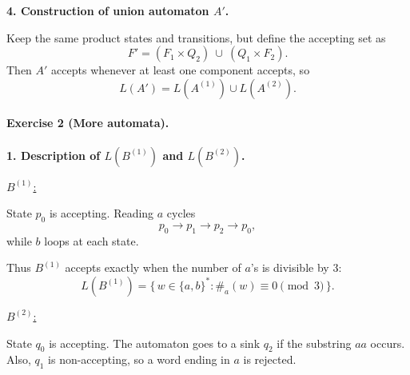 \documentclass[11pt, a4paper]{article}
\theoremstyle{definition}
\theoremstyle{remark}
\begin{document}
\medskip
\textbf{4. Construction of union automaton $A'$.}

Keep the same product states and transitions, but define the accepting set as
\[
F' = (F_1\times Q_2)\ \cup\ (Q_1\times F_2).
\]
Then $A'$ accepts whenever at least one component accepts, so
\[
L(A') = L(A^{(1)}) \cup L(A^{(2)}).
\]

\bigskip
\paragraph{Exercise 2 (More automata).}

\medskip
\textbf{1. Description of $L(B^{(1)})$ and $L(B^{(2)})$.}

\medskip
\underline{$B^{(1)}$:}

\begin{center}
\end{center}

State $p_0$ is accepting. Reading $a$ cycles
\[
p_0 \to p_1 \to p_2 \to p_0,
\]
while $b$ loops at each state.

Thus $B^{(1)}$ accepts exactly when the number of $a$'s is divisible by $3$:
\[
L(B^{(1)})=\{\,w\in\{a,b\}^* : \#_a(w)\equiv 0 \pmod 3\,\}.
\]

\medskip
\underline{$B^{(2)}$:}

\begin{center}
\end{center}

State $q_0$ is accepting. The automaton goes to a sink $q_2$ if the substring $aa$ occurs.
Also, $q_1$ is non-accepting, so a word ending in $a$ is rejected.
\end{document}
